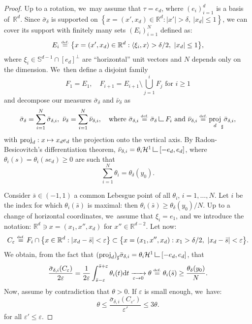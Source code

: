 \documentclass[JEP,XML,SOM,Unicode,NoFloatCountersInSection,published]{cedram}
\newcommand\mto{\mathchoice{\longmapsto}{\mapsto}{\mapsto}{\mapsto}}
\theoremstyle{definition}
\newcommand{\eqdef}{\ensuremath{\stackrel{\mbox{\upshape\tiny def.}}{=}}}
\newcommand{\inner}[1]{\left\langle#1\right\rangle}
\newcommand\LM[1]{\hbox{\vrule width.5pt \vbox to#1pt{\vfill \hrule width#1pt height.5pt}}}
\newcommand\LL{{\mathchoice {\>\LM7\>}{\>\LM7\>}{\,\LM5\,}{\,\LM{3.35}\,}}}
\newcommand{\mres}{\LL}
\newcommand\cH{\mathcal{H}}
\newcommand{\RR}{\mathbb{R}}
\DeclareMathOperator{\proj}{proj}
\newcommand\dd{\mathrm{d}}
\begin{document}
\begin{proof}
Up to a rotation, we~may assume that $\tau = e_d$, where $(e_i)_{i = 1}^d$ is a basis of~${\RR}^d$.
Since $\bar \sigma_{\delta}$ is supported on $\left\{x = (x',x_d) \in {\RR}^d : |x'|>\delta,\ |x_d|\le 1 \right\}$,
we can cover its support with finitely many sets
$(E_i)_{i=1}^N$ defined as:
\[
E_i
\eqdef
\bigl\{
x = (x',x_d) \in {\RR}^d :
\inner{\xi_i, x} > \delta/2,
\ |x_d| \le 1
\bigr\},
\]
where $\xi_i \in \mathbb{S}^{d-1} \cap [e_d]^\perp$ are ``horizontal'' unit
vectors and $N$ depends only on the dimension. We~then define a disjoint family
\[
F_1 = E_1, \quad F_{i+1} = E_{i+1}\setminus \bigcup_{j=1}^i F_j \text{ for $i\ge 1$}
\]
and decompose our measures $\bar \sigma_{\delta}$ and $\bar \nu_{\delta}$ as
\[
\bar \sigma_{\delta} = \sum_{i = 1}^N \bar \sigma_{\delta, i}, \
\bar \nu_{\delta} = \sum_{i = 1}^N \bar \nu_{\delta, i},\quad
\text{where }
\bar \sigma_{\delta, i} \eqdef \bar \sigma_{\delta} \mres F_i
\text{ and }
\bar \nu_{\delta, i} \eqdef {\proj_d}_\sharp\bar \sigma_{\delta, i},
\]
with $\proj_d : x\mto x_d e_d$ the projection onto the vertical axis.
By Radon-Be\-si\-co\-vitch's differentiation theorem, $\bar \nu_{\delta, i} = \theta_i \cH^1\mres[-e_d, e_d]$, where $\theta_i(s) = \theta_i(s e_d)\ge 0$ are such that
\[
\sum_{i = 1}^N \theta_i = \theta_\delta(y_0).
\]

Consider $\bar s\in (-1,1)$ a common Lebesgue point of all $\theta_i$,
$i=1,\dots, N$. Let $i$ be the index for which $\theta_i(\bar s)$ is maximal: then $\theta_i(\bar s) \ge \theta_\delta(y_0)/N$. Up to a change of horizontal coordinates, we~assume that $\xi_i = e_1$,
and we introduce the notation: $\RR^d \ni x = (x_1, x'', x_d)$ for $x'' \in \RR^{d-2}$.
Let now:
\begin{equation*}
C_{\varepsilon}
\eqdef
F_i \cap \bigl\{ x \in\RR^d : |x_d- \bar s|<\varepsilon \bigr\}
\subset \bigl\{
x = (x_1, x'', x_d) :
x_1 > \delta/2,
\ |x_d - \bar s| < \varepsilon
\bigr\}.
\end{equation*}
We obtain, from the fact that ${(\proj_d)}_\sharp \bar \sigma_{\delta, i} = \theta_i\cH^1\mres [-e_d,e_d]$, that
\[
\frac{\bar \sigma_{\delta, i}(C_\varepsilon)}{2\varepsilon} =
\frac{1}{2\varepsilon} \int_{\bar s-\varepsilon}^{\bar s+\varepsilon}\theta_i(t)\dd t
\xrightarrow[\varepsilon \to 0]{}
\theta \eqdef \theta_i(\bar s) \ge \frac{\theta_\delta(y_0)}{N}.
\]
Now, assume by contradiction that $\theta>0$. If $\varepsilon$ is small enough, we~have:
\begin{equation}\label{eq.condition_t}
\theta
\le
\frac{\bar \sigma_{\delta, i}(C_{\varepsilon'})}{\varepsilon'}
\le
3\theta.
\end{equation}
for all $\varepsilon'\le \varepsilon$.


\end{proof}
\end{document}
